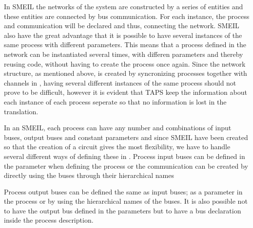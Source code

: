 

In SMEIL the networks of the system are constructed by a series of entities and these entities are connected by bus communication. For each instance, the process and communication will be declared and thus, connecting the network. SMEIL also have the great advantage that it is possible to have several instances of the same process with different parameters. This means that a process defined in the network can be instantiated several times, with differen parameters and thereby reusing code, without having to create the process once again. Since the network structure, as mentioned above, is created by syncronizing processes together with channels in \cspm, having several different instances of the same process should not prove to be difficult, however it is evident that TAPS keep the information about each instance of each process seperate so that no information is lost in the translation.




In an SMEIL, each process can have any number and combinations of input buses, output buses and constant parameters and since SMEIL have been created so that the creation of a circuit gives the most flexibility, we have to handle several different ways of defining these in \cspm.
Process input buses can be defined in the parameter when defining the process or the communication can be created by directly using the buses through their hierarchical names %

Process output buses can be defined the same as input buses; as a parameter in the process or by using the hierarchical names of the buses. It is also possible not to have the output bus defined in the parameters but to have a bus declaration inside the process description.




